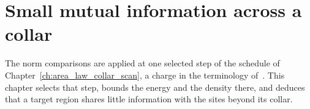\chapter{Small mutual information across a collar}
\label{ch:area_law_selected_charge}

The norm comparisons are applied at one selected step of the schedule of
Chapter~\ref{ch:area_law_collar_scan}, a charge in the terminology
of~\cite[Section~9]{OpenAI2026AreaLaw}. This chapter selects that step, bounds
the energy and the density there, and deduces that a target region shares
little information with the sites beyond its collar.















